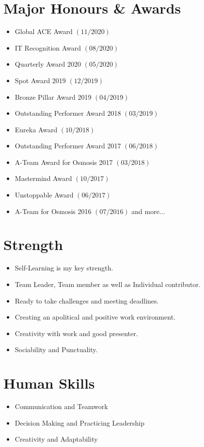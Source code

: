 \documentclass[11pt, a4paper]{article}
\begin{document}
\section*{\color{NavyBlue}Major Honours \& Awards}
\vspace{-2mm}
\begin{itemize}[noitemsep, nolistsep,label=\textcolor{NavyBlue}{\scriptsize\faTrophy}]
\item Global ACE Award $(11/2020)$
\item IT Recognition Award $(08/2020)$
\item Quarterly Award 2020 $(05/2020)$
\item Spot Award 2019 $(12/2019)$
\item Bronze Pillar Award 2019 $(04/2019)$
\item Outstanding Performer Award 2018 $(03/2019)$
\item Eureka Award $(10/2018)$
\item Outstanding Performer Award 2017 $(06/2018)$
\item A-Team Award for Osmosis 2017 $(03/2018)$
\item Mastermind Award $(10/2017)$
\item Unstoppable Award $(06/2017)$
\item A-Team for Osmosis 2016 $(07/2016)$ and more...
\end{itemize}

\section*{\color{NavyBlue}Strength}
\vspace{-2mm}
\begin{itemize}[noitemsep, nolistsep,label=\textcolor{NavyBlue}{\scriptsize\faArrowRight}]
\item Self-Learning is my key strength.
\item Team Leader, Team member as well as Individual contributor.
\item Ready to take challenges and meeting deadlines.
\item Creating an apolitical and positive work environment.
\item Creativity with work and good presenter.
\item Sociability and Punctuality.
\end{itemize}

\section*{\color{NavyBlue}Human Skills}
\vspace{-2mm}
\begin{itemize}[noitemsep, nolistsep,label=\textcolor{NavyBlue}{\scriptsize\faPlay}]
\item Communication and Teamwork
\item Decision Making and Practicing Leadership
\item Creativity and Adaptability
\end{itemize}
\end{document}
